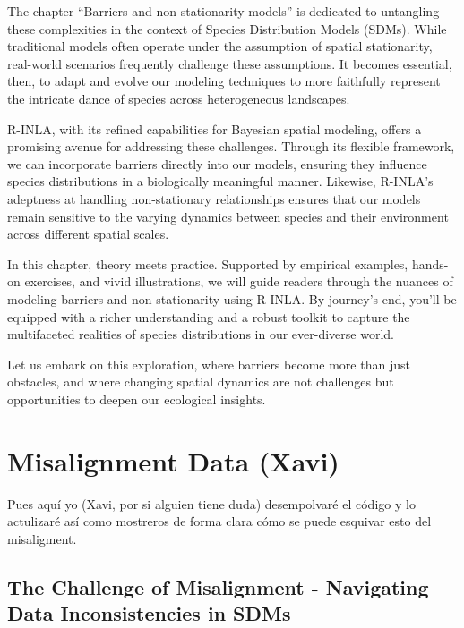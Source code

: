 \documentclass[
]{krantz}
\begin{document}
The chapter ``Barriers and non-stationarity models'' is dedicated to untangling these complexities in the context of Species Distribution Models (SDMs). While traditional models often operate under the assumption of spatial stationarity, real-world scenarios frequently challenge these assumptions. It becomes essential, then, to adapt and evolve our modeling techniques to more faithfully represent the intricate dance of species across heterogeneous landscapes.

R-INLA, with its refined capabilities for Bayesian spatial modeling, offers a promising avenue for addressing these challenges. Through its flexible framework, we can incorporate barriers directly into our models, ensuring they influence species distributions in a biologically meaningful manner. Likewise, R-INLA's adeptness at handling non-stationary relationships ensures that our models remain sensitive to the varying dynamics between species and their environment across different spatial scales.

In this chapter, theory meets practice. Supported by empirical examples, hands-on exercises, and vivid illustrations, we will guide readers through the nuances of modeling barriers and non-stationarity using R-INLA. By journey's end, you'll be equipped with a richer understanding and a robust toolkit to capture the multifaceted realities of species distributions in our ever-diverse world.

Let us embark on this exploration, where barriers become more than just obstacles, and where changing spatial dynamics are not challenges but opportunities to deepen our ecological insights.

\pagebreak
\setcounter{chapter}{9}
\setcounter{section}{0}
\renewcommand{\thepage}{\arabic{page}}

\hypertarget{misalignment-data-xavi}{%
\chapter{Misalignment Data (Xavi)}\label{misalignment-data-xavi}}

Pues aquí yo (Xavi, por si alguien tiene duda) desempolvaré el código y lo actulizaré así como mostreros de forma clara cómo se puede esquivar esto del misaligment.

\hypertarget{the-challenge-of-misalignment---navigating-data-inconsistencies-in-sdms}{%
\section{The Challenge of Misalignment - Navigating Data Inconsistencies in SDMs}\label{the-challenge-of-misalignment---navigating-data-inconsistencies-in-sdms}}
\end{document}
